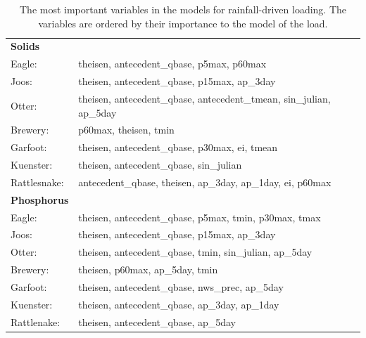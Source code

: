 \documentclass[12pt]{article}
\begin{document}
\begin{table}[h!]\small
    \begin{center}
    \begin{tabular}{ll}
        \textbf{Solids} & \\
        \hspace{5mm} Eagle: & theisen, antecedent\_qbase, p5max, p60max\\
        \hspace{5mm} Joos: & theisen, antecedent\_qbase, p15max, ap\_3day\\
        \hspace{5mm} Otter: & theisen, antecedent\_qbase, antecedent\_tmean, sin\_julian, ap\_5day\\
        \hspace{5mm} Brewery: & p60max, theisen, tmin\\
        \hspace{5mm} Garfoot: & theisen, antecedent\_qbase, p30max, ei, tmean\\
        \hspace{5mm} Kuenster: & theisen, antecedent\_qbase, sin\_julian\\
        \hspace{5mm} Rattlesnake: & antecedent\_qbase, theisen, ap\_3day, ap\_1day, ei, p60max
    \vspace{2mm}\\
        \textbf{Phosphorus} & \\
        \hspace{5mm} Eagle: & theisen, antecedent\_qbase, p5max, tmin, p30max, tmax\\
        \hspace{5mm} Joos: & theisen, antecedent\_qbase, p15max, ap\_3day\\
        \hspace{5mm} Otter: & theisen, antecedent\_qbase, tmin, sin\_julian, ap\_5day\\
        \hspace{5mm} Brewery: & theisen, p60max, ap\_5day, tmin\\
        \hspace{5mm} Garfoot: & theisen, antecedent\_qbase, nws\_prec, ap\_5day\\
        \hspace{5mm} Kuenster: & theisen, antecedent\_qbase, ap\_3day, ap\_1day\\
        \hspace{5mm} Rattlenake: & theisen, antecedent\_qbase, ap\_5day\\
    \end{tabular}
    \caption{The most important variables in the models for rainfall-driven loading. The variables are ordered by their importance to the model of the load. \label{nosnow_predictor_list}}
    \end{center}
\end{table}
\end{document}
